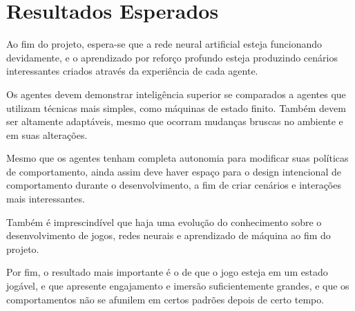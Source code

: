 \chapter[Resultados Esperados]{Resultados Esperados}\label{capitulo5}

Ao fim do projeto, espera-se que a rede neural artificial esteja funcionando devidamente, e o aprendizado por reforço profundo esteja produzindo cenários interessantes criados através da experiência de cada agente.

Os agentes devem demonstrar inteligência superior se comparados a agentes que utilizam técnicas mais simples, como máquinas de estado finito. Também devem ser altamente adaptáveis, mesmo que ocorram mudanças bruscas no ambiente e em suas alterações.

Mesmo que os agentes tenham completa autonomia para modificar suas políticas de comportamento, ainda assim deve haver espaço para o design intencional de comportamento durante o desenvolvimento, a fim de criar cenários e interações mais interessantes.

Também é imprescindível que haja uma evolução do conhecimento sobre o desenvolvimento de jogos, redes neurais e aprendizado de máquina ao fim do projeto.

Por fim, o resultado mais importante é o de que o jogo esteja em um estado jogável, e que apresente engajamento e imersão suficientemente grandes, e que os comportamentos não se afunilem em certos padrões depois de certo tempo.